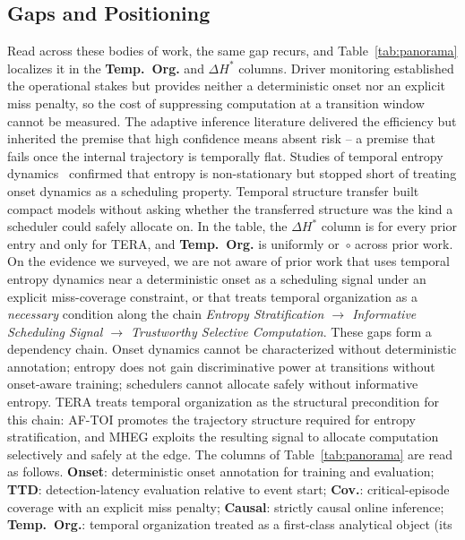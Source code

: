 \documentclass[a4paper,fleqn]{cas-dc}
\newcommand{\AFTOI}{\mbox{AF-TOI}\xspace}
\newcommand{\MHEG}{\mbox{MHEG}\xspace}
\begin{document}
\subsection{Gaps and Positioning}
\label{sec:rel_gap}
Read across these bodies of work, the same gap recurs, and Table~\ref{tab:panorama}
localizes it in the \textbf{Temp.~Org.} and \textbf{$\Delta H^{\ast}$} columns. Driver
monitoring established the operational stakes but provides neither a
deterministic onset nor an explicit miss penalty, so the cost of suppressing
computation at a transition window cannot be measured. The adaptive inference
literature delivered the efficiency but inherited the premise that high confidence
means absent risk -- a premise that fails once the internal trajectory is
temporally flat. Studies of temporal entropy
dynamics~\cite{braverman2020calib,dera2023trust}
confirmed that entropy is non-stationary but stopped short of treating onset
dynamics as a scheduling property. Temporal
structure transfer built compact models without asking whether the transferred
structure was the kind a scheduler could safely allocate on. In the table, the
\textbf{$\Delta H^{\ast}$} column is  for every prior entry and
 only for TERA, and \textbf{Temp.~Org.} is uniformly  or~$\circ$
across prior work. On the evidence we surveyed, we are not aware of prior work that
uses temporal entropy dynamics near a deterministic onset as a scheduling signal
under an explicit miss-coverage constraint, or that treats temporal organization as
a \emph{necessary} condition along the chain
\emph{Entropy Stratification $\rightarrow$ Informative Scheduling Signal $\rightarrow$
Trustworthy Selective Computation}.
These gaps form a dependency chain. Onset dynamics cannot be characterized
without deterministic annotation; entropy does not gain discriminative power at
transitions without onset-aware training; schedulers cannot allocate safely
without informative entropy. TERA treats temporal organization as the
structural precondition for this chain: \AFTOI promotes the trajectory
structure required for entropy stratification, and \MHEG exploits the resulting
signal to allocate computation selectively and safely at the edge.
The columns of Table~\ref{tab:panorama} are read as follows.
\textbf{Onset}: deterministic onset annotation for training and evaluation;
\textbf{TTD}: detection-latency evaluation relative to event start;
\textbf{Cov.}: critical-episode coverage with an explicit miss penalty;
\textbf{Causal}: strictly causal online inference; \textbf{Temp.~Org.}:
temporal organization treated as a first-class analytical object (its
\end{document}
